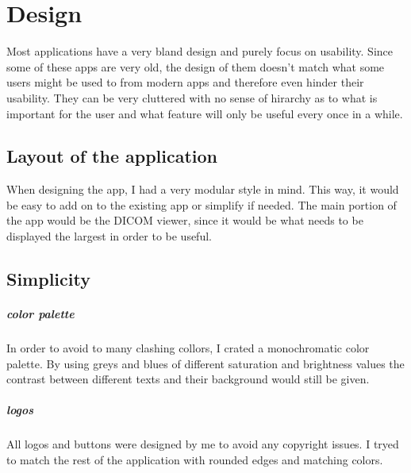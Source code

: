 \section{Design}
\label{Design}
Most applications have a very bland design and purely focus on usability. Since some of these apps are very old, the design of them doesn't match what some users might be used to from modern apps and therefore even hinder their usability. They can be very cluttered with no sense of hirarchy as to what is important for the user and what feature will only be useful every once in a while.

\subsection{Layout of the application}
\label{Layout of the application}
When designing the app, I had a very modular style in mind. This way, it would be easy to add on to the existing app or simplify if needed. The main portion of the app would be the DICOM viewer, since it would be what needs to be displayed the largest in order to be useful.

\subsection{Simplicity}
\label{Simplicity}
\subparagraph{color palette}
In order to avoid to many clashing collors, I crated a monochromatic color palette. By using greys and blues of different saturation and brightness values the contrast between different texts and their background would still be given.
\subparagraph{logos}
All logos and buttons were designed by me to avoid any copyright issues. I tryed to match the rest of the application with rounded edges and matching colors.
